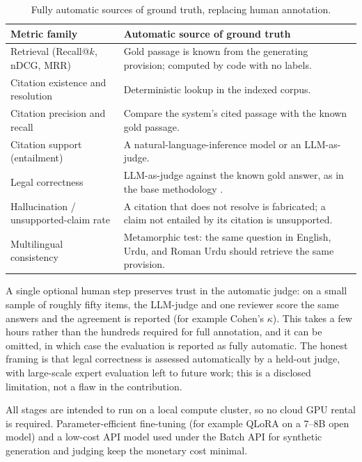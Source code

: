 \documentclass[10pt,twocolumn]{article}
\renewcommand{\arraystretch}{1.25}
\begin{document}
\begin{table}[t]
\centering
\caption{Fully automatic sources of ground truth, replacing human annotation.}
\label{tab:rd-auto}
\footnotesize
\setlength{\tabcolsep}{5pt}
\renewcommand{\arraystretch}{1.3}
\begin{tabularx}{\textwidth}{>{\raggedright\arraybackslash}p{4.2cm} >{\raggedright\arraybackslash}X}
\toprule
\textbf{Metric family} & \textbf{Automatic source of ground truth} \\
\midrule
Retrieval (Recall@$k$, nDCG, MRR) & Gold passage is known from the generating provision; computed by code with no labels. \\
Citation existence and resolution & Deterministic lookup in the indexed corpus. \\
Citation precision and recall & Compare the system's cited passage with the known gold passage. \\
Citation support (entailment) & A natural-language-inference model or an LLM-as-judge. \\
Legal correctness & LLM-as-judge against the known gold answer, as in the base methodology \citep{ren2026}. \\
Hallucination / unsupported-claim rate & A citation that does not resolve is fabricated; a claim not entailed by its citation is unsupported. \\
Multilingual consistency & Metamorphic test: the same question in English, Urdu, and Roman Urdu should retrieve the same provision. \\
\bottomrule
\end{tabularx}
\end{table}

A single optional human step preserves trust in the automatic judge: on a small sample of roughly fifty
items, the LLM-judge and one reviewer score the same answers and the agreement is reported (for example
Cohen's $\kappa$). This takes a few hours rather than the hundreds required for full annotation, and it can
be omitted, in which case the evaluation is reported as fully automatic. The honest framing is that legal
correctness is assessed automatically by a held-out judge, with large-scale expert evaluation left to
future work; this is a disclosed limitation, not a flaw in the contribution.

All stages are intended to run on a local compute cluster, so no cloud GPU rental is required.
Parameter-efficient fine-tuning (for example QLoRA on a 7--8B open model) and a low-cost API model used
under the Batch API for synthetic generation and judging keep the monetary cost minimal.
\end{document}
